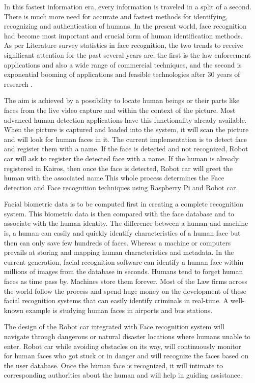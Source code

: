 \documentclass[sigconf]{acmart}
\begin{document}
In this fastest information era, every information is traveled in a split of a second. 
There is much more need for accurate and fastest methods for identifying, recognizing 
and authentication of humans. In the present world, face recognition had become most 
important and crucial form of human identification methods. As per Literature survey 
statistics in face recognition, the two trends to receive significant attention for 
the past several years are; the first is the law enforcement applications and also a 
wide range of commercial techniques, and the second is exponential booming of 
applications and feasible technologies after 30 years of research \cite{riddhi2013}.

The aim is achieved by a possibility to locate human beings or their parts like faces 
from the live video capture and within the context of the picture. Most advanced human 
detection applications have this functionality already available. When the picture is 
captured and loaded into the system, it will scan the picture and will look for human 
faces in it. The current implementation is to detect face and register them with a name.
If the face is detected and not recognized, Robot car will ask to register the detected 
face with a name. If the human is already registered in Kairos, then once the face is 
detected, Robot car will greet the human with the associated name.This whole process 
determines the Face detection and Face recognition techniques using Raspberry Pi and 
Robot car.

Facial biometric data is to be computed first in creating a complete recognition system. 
This biometric data is then compared with the face database and to associate with the 
human identity. The difference between a human and machine is, a human can easily and 
quickly identify characteristics of a human face but then can only save few hundreds 
of faces. Whereas a machine or computers prevails at storing and mapping human 
characteristics and metadata. In the current generation, facial recognition software can 
identify a human face within millions of images from the database in seconds. 
Humans tend to forget human faces as time pass by. Machines store them forever. 
Most of the Law firms across the world follow the process and spend huge money on the 
development of these facial recognition systems that can easily identify criminals in 
real-time. A well-known example is studying human faces in airports and bus stations.

The design of the Robot car integrated with Face recognition system will navigate through 
dangerous or natural disaster locations where humans unable to enter. Robot car while 
avoiding obstacles on its way, will continuously monitor for human faces who got stuck 
or in danger and will recognize the faces based on the user database. Once the human 
face is recognized, it will intimate to corresponding authorities about the human and 
will help in guiding assistance. 
\end{document}
